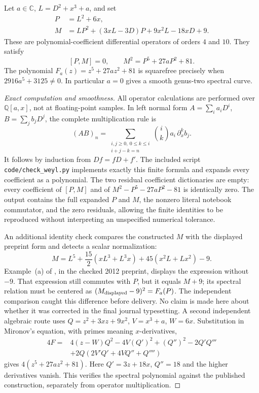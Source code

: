 \begin{proposition}\oursComputed\quad
\label{prop:certificate}
Let \(a\in\mathbb C\), \(L=D^2+x^3+a\), and set
\begin{align*}
 P&=L^2+6x,\\
 M&=LP^2+(3xL-3D)P+9x^2L-18xD+9.
\end{align*}
These are polynomial-coefficient differential operators of orders \(4\) and \(10\). They satisfy
\[
 [P,M]=0,\qquad M^2=P^5+27aP^2+81.
\]
The polynomial \(F_a(z)=z^5+27az^2+81\) is squarefree precisely when
\(2916a^5+3125\ne0\). In particular \(a=0\) gives a smooth genus-two spectral curve.
\end{proposition}
\begin{proof}[Exact computation and smoothness]
All operator calculations are performed over \(\mathbb Q[a,x]\), not at floating-point samples. In left normal form \(A=\sum_i a_iD^i\), \(B=\sum_j b_jD^j\), the complete multiplication rule is
\[
 (AB)_n=\sum_{\substack{i,j\ge0,\ 0\le k\le i\\i+j-k=n}}
 \binom{i}{k}a_i\,\partial_x^k b_j.
\]
It follows by induction from \(Df=fD+f'\). The included script \texttt{code/check\_weyl.py} implements exactly this finite formula and expands every coefficient as a polynomial. The two residual coefficient dictionaries are empty: every coefficient of \([P,M]\) and of \(M^2-P^5-27aP^2-81\) is identically zero. The output contains the full expanded \(P\) and \(M\), the nonzero literal notebook commutator, and the zero residuals, allowing the finite identities to be reproduced without interpreting an unspecified numerical tolerance.

An additional identity check compares the constructed \(M\) with the displayed preprint form and detects a scalar normalization:
\[
 M=L^5+\frac{15}{2}(xL^3+L^3x)+45(x^2L+Lx^2)-9.
\]
Example~(a) of \citet{mironov2011selfadjoint}, in the checked 2012 preprint, displays the expression without \(-9\). That expression still commutes with \(P\), but it equals \(M+9\); its spectral relation must be centered as \((M_{\rm displayed}-9)^2=F_a(P)\). The independent comparison caught this difference before delivery. No claim is made here about whether it was corrected in the final journal typesetting. A second independent algebraic route uses
\(Q=z^2+3xz+9x^2\), \(V=x^3+a\), \(W=6x\). Substitution in Mironov's equation, with primes meaning \(x\)-derivatives,
\begin{align*}
 4F={}&4(z-W)Q^2-4V(Q')^2+(Q'')^2-2Q'Q'''\\
      &+2Q(2V'Q'+4VQ''+Q'''')
\end{align*}
gives \(4(z^5+27az^2+81)\). Here \(Q'=3z+18x\), \(Q''=18\) and the higher derivatives vanish. This verifies the spectral polynomial against the published construction, separately from operator multiplication.


\end{proof}
